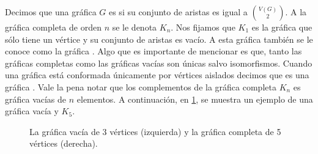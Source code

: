Decimos que una gr\'afica $G$ es  si su conjunto
de aristas es igual a $\binom{V(G)}{2}$. A la gr\'afica completa de orden $n$ se
le denota $K_n$. Nos fijamos que $K_1$ es la gr\'afica que s\'olo tiene un
v\'ertice y su conjunto de aristas es vac\'io. A esta gr\'afica tambi\'en se le
conoce como la gr\'afica . Algo que es importante de mencionar
es que, tanto las gr\'aficas completas como las gr\'aficas vac\'ias son \'unicas
salvo isomorfismos. Cuando una gr\'afica est\'a conformada \'unicamente por
v\'ertices aislados decimos que es una gr\'afica .
Vale la pena notar que los complementos de la gr\'afica
completa $K_n$ es gr\'afica vac\'ias de $n$ elementos. A continuaci\'on, en
\cref{fig:ex-va-comp}, se muestra un ejemplo de una gr\'afica vac\'ia y $K_5$.

\begin{figure}[ht!]
    \centering
        \caption{La gr\'afica vac\'ia de 3 v\'ertices (izquierda) y la
        gr\'afica completa de 5 v\'ertices (derecha).}
        \label{fig:ex-va-comp}
    \end{figure} 

\newpage

